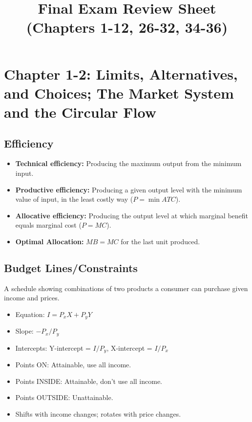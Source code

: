 \documentclass{article}
\begin{document}
\title{Final Exam Review Sheet (Chapters 1-12, 26-32, 34-36)}
\date{} %
\maketitle
\thispagestyle{empty} %

\section*{Chapter 1-2: Limits, Alternatives, and Choices; The Market System and the Circular Flow}

\subsection*{Efficiency}
\begin{itemize}
    \item \textbf{Technical efficiency:} Producing the maximum output from the minimum input.
    \item \textbf{Productive efficiency:} Producing a given output level with the minimum value of input, in the least costly way ($P = \min ATC$).
    \item \textbf{Allocative efficiency:} Producing the output level at which marginal benefit equals marginal cost ($P = MC$).
    \item \textbf{Optimal Allocation:} $MB=MC$ for the last unit produced.
\end{itemize}

\subsection*{Budget Lines/Constraints}
A schedule showing combinations of two products a consumer can purchase given income and prices.
\begin{itemize}
    \item Equation: $I = P_x X + P_y Y$
    \item Slope: $-P_x / P_y$
    \item Intercepts: Y-intercept = $I/P_y$, X-intercept = $I/P_x$
    \item Points ON: Attainable, use all income.
    \item Points INSIDE: Attainable, don't use all income.
    \item Points OUTSIDE: Unattainable.
    \item Shifts with income changes; rotates with price changes.
\end{itemize}
\end{document}
